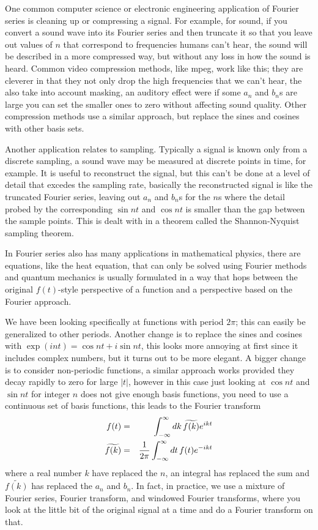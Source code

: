 \documentclass[12pt]{article}
\begin{document}
One common computer science or electronic engineering application of
Fourier series is cleaning up or compressing a signal. For example,
for sound, if you convert a sound wave into its Fourier series and
then truncate it so that you leave out values of $n$ that correspond
to frequencies humans can't hear, the sound will be described in a
more compressed way, but without any loss in how the sound is
heard. Common video compression methods, like mpeg, work like this;
they are cleverer in that they not only drop the high frequencies that
we can't hear, the also take into account masking, an auditory effect
were if some $a_n$ and $b_n$s are large you can set the smaller ones
to zero without affecting sound quality. Other compression methods use
a similar approach, but replace the sines and cosines with other basis
sets.

Another application relates to sampling. Typically a signal is known
only from a discrete sampling, a sound wave may be measured at
discrete points in time, for example. It is useful to reconstruct the
signal, but this can't be done at a level of detail that excedes the
sampling rate, basically the reconstructed signal is like the
truncated Fourier series, leaving out $a_n$ and $b_n$s for the $n$s
where the detail probed by the corresponding $\sin{nt}$ and $\cos{nt}$
is smaller than the gap between the sample points. This is dealt with
in a theorem called the Shannon-Nyquist sampling theorem.

In Fourier series also has many applications in mathematical physics,
there are equations, like the heat equation, that can only be solved
using Fourier methods and quantum mechanics is usually formulated in a
way that hops between the original $f(t)$-style perspective of a
function and a perspective based on the Fourier approach.

We have been looking specifically at functions with period $2\pi$;
this can easily be generalized to other periods. Another change is to
replace the sines and cosines with $\exp(int)=\cos{nt}+i\sin{nt}$,
this looks more annoying at first since it includes complex numbers,
but it turns out to be more elegant. A bigger change is to consider
non-periodic functions, a similar approach works provided they decay
rapidly to zero for large $|t|$, however in this case just looking at
$\cos{nt}$ and $\sin{nt}$ for integer $n$ does not give enough basis
functions, you need to use a continuous set of basis functions, this
leads to the Fourier transform
\begin{eqnarray}
f(t)&=&\int_{-\infty}^{\infty}dk\,\widetilde{f(k)}e^{ikt}\cr
\widetilde{f(k)}&=&\frac{1}{2\pi}\int_{-\infty}^{\infty}dt\,f(t)e^{-ikt}
\end{eqnarray}
where a real number $k$ have replaced the $n$, an integral has
replaced the sum and $\widetilde{f(k)}$ has replaced the $a_n$ and
$b_n$. In fact, in practice, we use a mixture of Fourier series,
Fourier transform, and windowed Fourier transforms, where you look at
the little bit of the original signal at a time and do a Fourier
transform on that.
\end{document}
